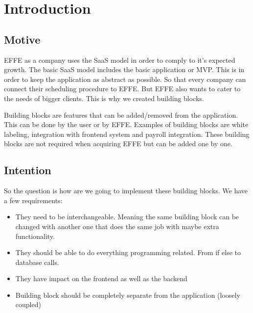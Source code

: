 \chapter{Introduction}

\section{Motive}
EFFE as a company uses the SaaS model in order to comply to it’s expected growth. The basic SaaS model includes the basic application or MVP. This is in order to keep the application as abstract as possible. So that every company can connect their scheduling procedure to EFFE. But EFFE also wants to cater to the needs of bigger clients. This is why we created building blocks.

Building blocks are features that can be added/removed from the application. This can be done by the user or by EFFE. Examples of building blocks are white labeling, integration with frontend system and payroll integration. These building blocks are not required when acquiring EFFE but can be added one by one.

\section{Intention}
So the question is how are we going to implement these building blocks. We have a few requirements:
\begin{itemize}
	\item They need to be interchangeable. Meaning the same building block can be changed with another one that does the same job with maybe extra functionality.
	
	\item They should be able to do everything programming related. From if else to database calls.
	
	\item They have impact on the frontend as well as the backend
	
	\item Building block should be completely separate from the application (loosely coupled)
\end{itemize}

